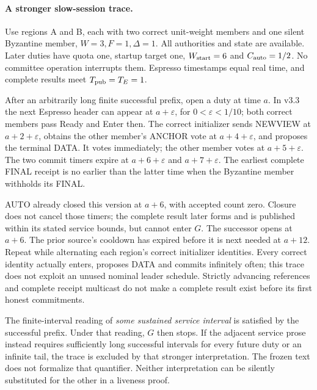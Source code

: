 \documentclass[11pt,a4paper]{article}
\begin{document}
\paragraph{A stronger slow-session trace.}
Use regions A and B, each with two correct unit-weight members and one
silent Byzantine member, $W=3,F=1,\Delta=1$. All authorities and state
are available. Later duties have quota one, startup target one,
$W_{\rm start}=6$ and $C_{\rm auto}=1/2$. No committee operation
interrupts them. Espresso timestamps equal real time, and complete
results meet $T_{\rm pub}=T_E=1$.

After an arbitrarily long finite successful prefix, open a duty at time
$a$. In v3.3 the next Espresso header can appear at $a+\varepsilon$,
for $0<\varepsilon<1/10$; both correct members pass Ready and Enter then.
The correct initializer sends NEWVIEW at $a+2+\varepsilon$, obtains
the other member's ANCHOR vote at $a+4+\varepsilon$, and proposes the
terminal DATA. It votes immediately; the other member votes at
$a+5+\varepsilon$. The two commit timers expire at
$a+6+\varepsilon$ and $a+7+\varepsilon$. The earliest complete FINAL
receipt is no earlier than the latter time when the Byzantine member
withholds its FINAL.

AUTO already closed this version at $a+6$, with accepted count zero.
Closure does not cancel those timers; the complete result later forms
and is published within its stated service bounds, but cannot enter
$G$. The successor opens at $a+6$. The prior source's cooldown has
expired before it is next needed at $a+12$. Repeat while alternating
each region's correct initializer identities. Every correct identity
actually enters, proposes DATA and commits infinitely often; this
trace does not exploit an unused nominal leader schedule. Strictly
advancing references and complete receipt multicast do not make a
complete result exist before its first honest commitments.

The finite-interval reading of \emph{some sustained service interval} is
satisfied by the successful prefix. Under that reading, $G$ then stops.
If the adjacent service prose instead requires sufficiently long
successful intervals for every future duty or an infinite tail, the
trace is excluded by that stronger interpretation. The frozen text
does not formalize that quantifier. Neither interpretation can be
silently substituted for the other in a liveness proof.
\end{document}
